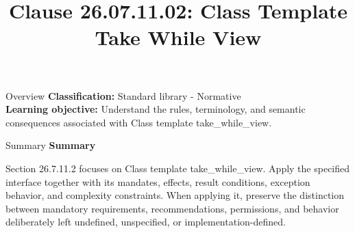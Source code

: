 \documentclass[10pt,letterpaper]{article}
\title{Clause 26.07.11.02: Class Template Take While View}
\author{}
\date{}
\begin{document}
\maketitle
\begin{CornellOverviewBox}{Overview}
\textbf{Classification:} Standard library - Normative\\[2pt]
\textbf{Learning objective:} Understand the rules, terminology, and semantic consequences associated with Class template take\_while\_view.
\end{CornellOverviewBox}\begin{CornellSummaryBox}{Summary}
{\sffamily\bfseries\color{Accent} Summary}\par\vspace{3pt}Section 26.7.11.2 focuses on Class template take\_while\_view. Apply the specified interface together with its mandates, effects, result conditions, exception behavior, and complexity constraints. When applying it, preserve the distinction between mandatory requirements, recommendations, permissions, and behavior deliberately left undefined, unspecified, or implementation-defined.
\end{CornellSummaryBox}
\end{document}
